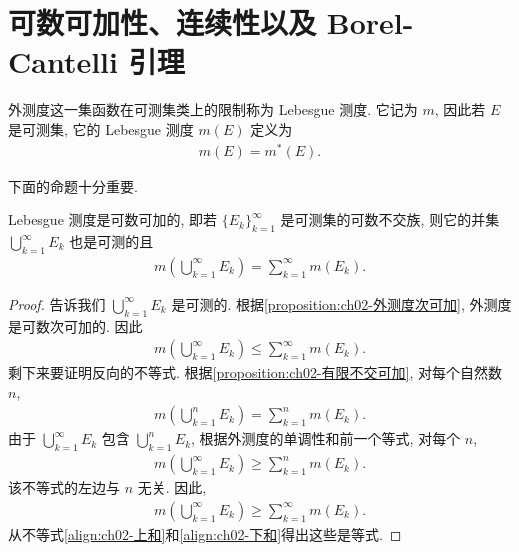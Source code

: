 \documentclass[../../main.tex]{subfiles}
\begin{document}
\section{可数可加性、连续性以及 Borel-Cantelli 引理}\label{section:ch02-可数可加}

\begin{definition}[Lebesgue 测度]\label{definition:ch02-Lebesgue测度}
外测度这一集函数在可测集类上的限制称为 Lebesgue 测度. 它记为 $m$, 因此若 $E$ 是可测集, 它的 Lebesgue 测度 $m(E)$ 定义为
\begin{align*}
m(E)=m^{*}(E).
\end{align*}
\end{definition}

下面的命题十分重要.

\begin{proposition}\label{proposition:ch02-可数可加}
Lebesgue 测度是可数可加的, 即若 $\{E_{k}\}_{k=1}^{\infty}$ 是可测集的可数不交族, 则它的并集 $\bigcup_{k=1}^{\infty}E_{k}$ 也是可测的且
\begin{align*}
m\left(\bigcup_{k=1}^{\infty}E_{k}\right)=\sum_{k=1}^{\infty}m(E_{k}).
\end{align*}
\end{proposition}

\begin{proof}
 告诉我们 $\bigcup_{k=1}^{\infty}E_{k}$ 是可测的. 根据\cref{proposition:ch02-外测度次可加}, 外测度是可数次可加的. 因此
\begin{align}
m\left(\bigcup_{k=1}^{\infty}E_{k}\right)\leqslant\sum_{k=1}^{\infty}m(E_{k}).\label{align:ch02-上和}
\end{align}
剩下来要证明反向的不等式. 根据\cref{proposition:ch02-有限不交可加}, 对每个自然数 $n$,
\begin{align*}
m\left(\bigcup_{k=1}^{n}E_{k}\right)=\sum_{k=1}^{n}m(E_{k}).
\end{align*}
由于 $\bigcup_{k=1}^{\infty}E_{k}$ 包含 $\bigcup_{k=1}^{n}E_{k}$, 根据外测度的单调性和前一个等式, 对每个 $n$,
\begin{align*}
m\left(\bigcup_{k=1}^{\infty}E_{k}\right)\geqslant\sum_{k=1}^{n}m(E_{k}).
\end{align*}
该不等式的左边与 $n$ 无关. 因此,
\begin{align}
m\left(\bigcup_{k=1}^{\infty}E_{k}\right)\geqslant\sum_{k=1}^{\infty}m(E_{k}).\label{align:ch02-下和}
\end{align}
从不等式\eqref{align:ch02-上和}和\eqref{align:ch02-下和}得出这些是等式.
\end{proof}
\end{document}
